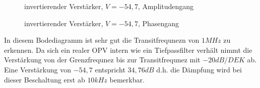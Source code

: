\begin{figure}[H]
  \centering
  \caption{invertierender Verst\"arker, $V=-54,7$, Amplitudengang}
\end{figure}
\begin{figure}[H]
  \centering
  \caption{invertierender Verst\"arker, $V=-54,7$, Phasengang}
\end{figure}
\noindent
In diesem Bodediagramm ist sehr gut die Transitfrequnezn von $1MHz$ zu erkennen. Da sich ein realer OPV intern wie ein Tiefpassfilter verh\"alt nimmt die Verst\"arkung von der Grenzfrequnez bis zur Transitfrequnez mit $-20dB/DEK$ ab. Eine Verst\"arkung von $-54,7$ entspricht $34,76dB$ d.h. die D\"ampfung wird bei dieser Beschaltung erst ab $10kHz$ bemerkbar.

